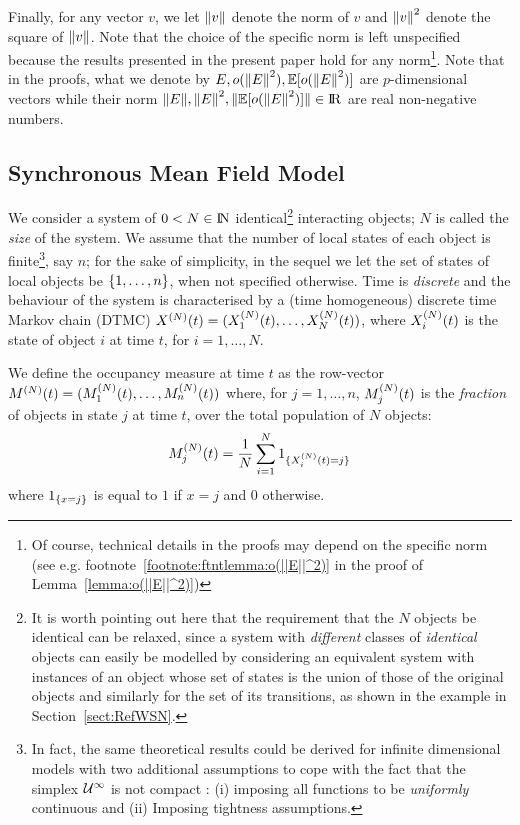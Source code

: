 \documentclass{elsarticle}
\begin{document}
Finally, for any vector $v$, we let $\norm{v}$ denote the norm of $v$
and $\norm{v}^2$ denote the square of $\norm{v}$. Note that the choice
of the specific norm is left unspecified because the results presented
in the present paper hold for any norm\footnote{Of course, technical
  details in the proofs may depend on the specific norm (see
  e.g. footnote~\ref{footnote:ftntlemma:o(||E||^2)} in the proof of
  Lemma~\ref{lemma:o(||E||^2)})}.  Note that in the proofs, what we
denote by $E, o(\norm{E}^2), \esp{o(\norm{E}^2)}$ are $p$-dimensional
vectors while their norm
$\norm{E}, \norm{E}^2, \norm{\esp{o(\norm{E}^2)}} \in \reals$ are real
non-negative numbers.

\subsection{Synchronous Mean Field Model}


We consider a system of $0<N \in \mathrm{I\!N}$ identical\footnote{It is worth
  pointing out here that the requirement that the $N$ 
  objects be identical 
  can be relaxed, since a system with {\em different} classes of {\em
    identical} objects can easily be modelled by considering an
  equivalent system with instances of an object whose set of states is
  the union of those of the original objects and similarly for the set
  of its transitions, as shown in the example in
  Section~\ref{sect:RefWSN}.} interacting objects; $N$ is called the
{\em size} of the system.  We assume that the number of local states
of each object is finite\footnote{In fact, the same theoretical
  results could be derived for infinite dimensional models with two
  additional assumptions to cope with the fact that the simplex
  ${\cal U}^{\infty}$ is not compact : (i) imposing all functions to be
  \emph{uniformly} continuous and (ii) Imposing tightness
  assumptions.}, say $n$; for the sake of simplicity, in the sequel we
let the set of states of local objects be $\{1,\ldots, n\}$, when
not specified otherwise.  Time is {\em discrete} and the behaviour of
the system is characterised by a (time homogeneous) discrete time
Markov chain (DTMC) $X^{(N)}(t)=(X_1^{(N)}(t), \ldots, X_N^{(N)}(t))$,
where $X_i^{(N)}(t)$ is the state of object $i$ at time $t$, for
$i=1,\ldots, N$.

We define the occupancy measure at time $t$ as the row-vector
$M^{(N)}(t)=(M_1^{(N)}(t), \ldots, M_n^{(N)}(t))$ where, for
$j=1,\ldots, n$, $M_j^{(N)}(t)$ is the {\em fraction} of objects in state
$j$ at time $t$, over the total population of $N$ objects:
\begin{align*}
  M_j^{(N)}(t) = \frac{1}{N}\sum_{i=1}^N 1_{\{X_i^{(N)}(t)=j\}}
\end{align*}
where $1_{\{x=j\}}$ is equal to $1$ if $x=j$ and $0$ otherwise.
\end{document}
